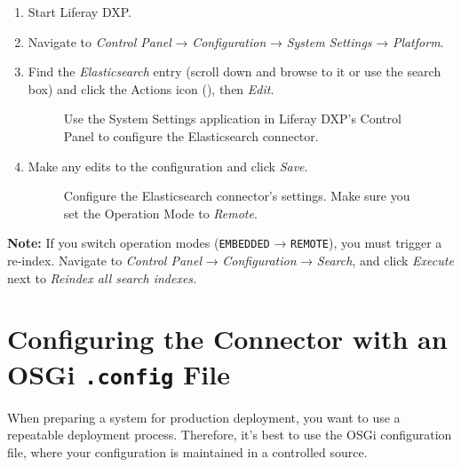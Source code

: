 \begin{enumerate}
\def\labelenumi{\arabic{enumi}.}
\item
  Start Liferay DXP.
\item
  Navigate to \emph{Control Panel} → \emph{Configuration} → \emph{System
  Settings} → \emph{Platform}.
\item
  Find the \emph{Elasticsearch} entry (scroll down and browse to it or
  use the search box) and click the Actions icon
  (),
  then \emph{Edit}.

  \begin{figure}
  \centering
  \caption{Use the System Settings application in Liferay DXP's Control
  Panel to configure the Elasticsearch connector.}
  \end{figure}
\item
  Make any edits to the configuration and click \emph{Save}.

  \begin{figure}
  \centering
  \caption{Configure the Elasticsearch connector's settings. Make sure
  you set the Operation Mode to \emph{Remote}.}
  \end{figure}
\end{enumerate}

\noindent\hrulefill

\textbf{Note:} If you switch operation modes (\texttt{EMBEDDED} →
\texttt{REMOTE}), you must trigger a re-index. Navigate to \emph{Control
Panel} → \emph{Configuration} → \emph{Search}, and click \emph{Execute}
next to \emph{Reindex all search indexes.}

\noindent\hrulefill

\section{\texorpdfstring{Configuring the Connector with an OSGi
\texttt{.config}
File}{Configuring the Connector with an OSGi .config File}}\label{configuring-the-connector-with-an-osgi-.config-file}

When preparing a system for production deployment, you want to use a
repeatable deployment process. Therefore, it's best to use the OSGi
configuration file, where your configuration is maintained in a
controlled source.

